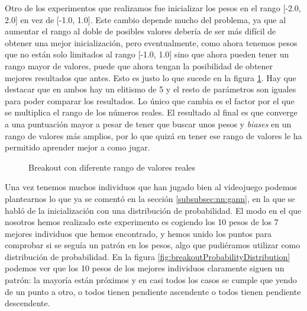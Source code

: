 Otro de los experimentos que realizamos fue inicializar los pesos en el rango [-2.0, 2.0] en vez de [-1.0, 1.0]. Este cambio depende mucho del problema, ya que al aumentar el rango al doble de posibles valores debería de ser más difícil de obtener una mejor inicialización, pero eventualmente, como ahora tenemos pesos que no están solo limitados al rango [-1.0, 1.0] sino que ahora pueden tener un rango mayor de valores, puede que ahora tengan la posibilidad de obtener mejores resultados que antes. Esto es justo lo que sucede en la figura \ref{fig:breakoutWeightsFactor2}. Hay que destacar que en ambos hay un elitismo de 5 y el resto de parámetros son iguales para poder comparar los resultados. Lo único que cambia es el factor por el que se multiplica el rango de los números reales. El resultado al final es que converge a una puntuación mayor a pesar de tener que buscar unos pesos y \textit{biases} en un rango de valores más amplios, por lo que quizá en tener ese rango de valores le ha permitido aprender mejor a como jugar.

\begin{figure}[H]
    \centering
    
    
    \caption{Breakout con diferente rango de valores reales}
    \label{fig:breakoutWeightsFactor2}
\end{figure}

Una vez tenemos muchos individuos que han jugado bien al videojuego podemos plantearnos lo que ya se comentó en la sección \ref{subsubsec:nn:gann}, en la que se habló de la inicialización con una distribución de probabilidad. El modo en el que nosotros hemos realizado este experimento es cogiendo los 10 pesos de los 7 mejores individuos que hemos encontrado, y hemos unido los puntos para comprobar si se seguía un patrón en los pesos, algo que pudiéramos utilizar como distribución de probabilidad. En la figura \ref{fig:breakoutProbabilityDistribution} podemos ver que los 10 pesos de los mejores individuos claramente siguen un patrón: la mayoría están próximos y en casi todos los casos se cumple que yendo de un punto a otro, o todos tienen pendiente ascendente o todos tienen pendiente descendente.

